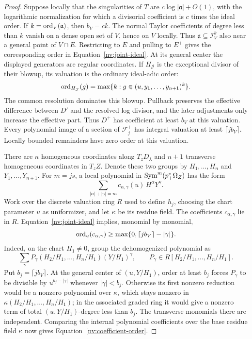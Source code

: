 \begin{proof}
Suppose locally that the singularities of \(T\) are
\(c\log|\mathfrak a|+O(1)\), with the logarithmic normalization for
which a divisorial coefficient is \(c\) times the ideal order.  If
\(k=\operatorname{ord}_V(\mathfrak a)\), then \(b_V=ck\).
The normal Taylor coefficients of degree less than \(k\) vanish on a
dense open set of \(V\), hence on \(V\) locally.  Thus
\(\mathfrak a\subseteq\mathcal I_V^k\) also near a general point of
\(V\cap E\).  Restricting to \(E\) and pulling to \(E^+\) gives the
corresponding order in Equation~\eqref{nv:joint-ideal}.  At its general center
the displayed generators are regular coordinates.  If \(H_{\mathcal J}\)
is the exceptional divisor of their blowup, its valuation is the
ordinary ideal-adic order:
\[
 \operatorname{ord}_{H_{\mathcal J}}(g)
  =\max\{k:g\in(u,y_1,\ldots,y_{n+1})^k\}.
\]
The common resolution dominates this blowup.  Pullback preserves the
effective difference between \(D'\) and the resolved log divisor,
and the later adjustments only increase the effective part.  Thus
\(D^+\) has coefficient at least \(b_V\) at this valuation.
Every polynomial image of a section of \(\mathcal F_j^+\) has
integral valuation at least \(\lceil jb_V\rceil\).  Locally bounded
remainders have zero order at this valuation.

There are \(n\) homogeneous coordinates along \(T_zD_\lambda\) and
\(n+1\) transverse homogeneous coordinates in \(T_zZ\).  Denote
these two groups by \(H_1,\ldots,H_n\) and
\(Y_1,\ldots,Y_{n+1}\).  For \(m=js\), a local polynomial in
\(\operatorname{Sym}^m(p_+^*\Omega_Z)\) has the form
\[
 \sum_{|\alpha|+|\gamma|=m}
          c_{\alpha,\gamma}(u)\,H^\alpha Y^\gamma.
\]
Work over the discrete valuation ring \(R\) used to define \(h_j\), choosing
the chart parameter \(u\) as uniformizer, and let \(\kappa\) be its residue
field.  The coefficients \(c_{\alpha,\gamma}\) lie in \(R\).
Equation~\eqref{nv:joint-ideal}
implies, monomial by monomial,
\begin{equation}\label{nv:coefficient-order}
 \operatorname{ord}_u(c_{\alpha,\gamma})
       \ge\max\{0,\lceil jb_V\rceil-|\gamma|\}.
\end{equation}
Indeed, on the chart \(H_1\ne0\), group the dehomogenized polynomial as
\[
 \sum_\gamma
 P_\gamma(H_2/H_1,\ldots,H_n/H_1)(Y/H_1)^\gamma,
 \qquad P_\gamma\in R[H_2/H_1,\ldots,H_n/H_1].
\]
Put \(b_j=\lceil jb_V\rceil\).  At the general center of
\((u,Y/H_1)\), order at least \(b_j\) forces
\(P_\gamma\) to be divisible by \(u^{b_j-|\gamma|}\) whenever
\(|\gamma|<b_j\).  Otherwise its first nonzero reduction would be a
nonzero polynomial over \(\kappa\), which stays nonzero in
\(\kappa(H_2/H_1,\ldots,H_n/H_1)\); in the associated graded ring
it would give a nonzero term of total \((u,Y/H_1)\)-degree less than
\(b_j\).  The transverse monomials there are independent.  Comparing
the internal polynomial coefficients over the base residue field
\(\kappa\) now gives Equation~\eqref{nv:coefficient-order}.


\end{proof}
